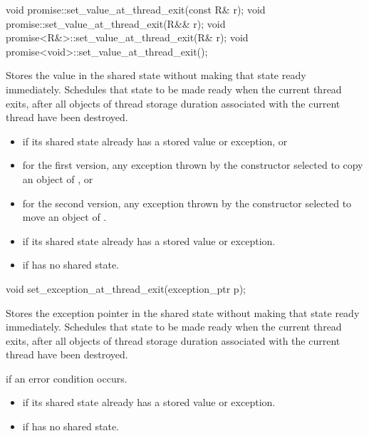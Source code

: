 %
%
\begin{itemdecl}
void promise::set_value_at_thread_exit(const R& r);
void promise::set_value_at_thread_exit(R&& r);
void promise<R&>::set_value_at_thread_exit(R& r);
void promise<void>::set_value_at_thread_exit();
\end{itemdecl}

\begin{itemdescr}
\pnum
\effects Stores the value  in the shared state without making that
state ready immediately. Schedules that state to be made ready when the current
thread exits, after all objects of thread storage duration associated with the
current thread have been destroyed.

\pnum
\throws

\begin{itemize}
\item {} if its shared state
already has a stored value or exception, or
\item for the first version, any exception thrown by the constructor selected to copy an object of , or
\item for the second version, any exception thrown by the constructor selected to move an object of .
\end{itemize}

\pnum
\errors
\begin{itemize} 
\item {} if its shared state
already has a stored value or exception.
\item {} if  has no shared state.
\end{itemize}
\end{itemdescr}

%
%
\begin{itemdecl}
void set_exception_at_thread_exit(exception_ptr p);
\end{itemdecl}

\begin{itemdescr}
\pnum
\effects Stores the exception pointer  in the shared state without
making that state ready immediately. Schedules that state to be made ready when
the current thread exits, after all objects of thread storage duration
associated with the current thread have been destroyed.

\pnum
\throws {} if an error condition occurs.

\pnum
\errors
\begin{itemize} 
\item {} if its shared state
already has a stored value or exception.
\item {} if  has no shared state.
\end{itemize}
\end{itemdescr}

